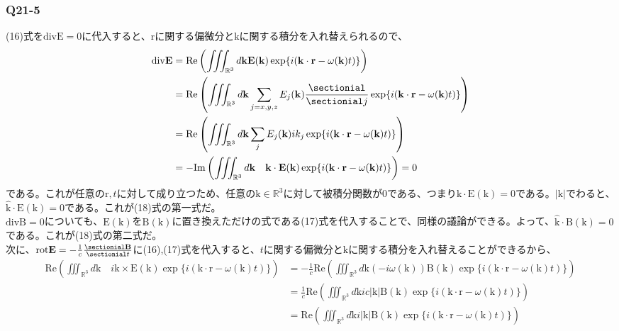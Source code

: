 \documentclass[platex,dvipdfmx,a4paper]{jsarticle}
\newcommand{\hb}[2]{\frac{\sectionial #1}{\sectionial #2}}
\newcommand{\vect}[1]{\boldsymbol{\mathrm{#1}}}
\begin{document}
  \subsubsection*{Q21-5}
  (16)式を$\mathrm{div}\vect{E}=0$に代入すると、$\vect{r}$に関する偏微分と$\vect{k}$に関する積分を入れ替えられるので、
  \begin{align*}
    \mathrm{div}\vect{E} &= \mathrm{Re}\left(\iiint_{\mathbb{R}^3} d\vect{k} \vect{E}(\vect{k}) \exp\{i(\vect{k}\cdot\vect{r}-\omega(\vect{k})t)\}\right)\\
    &= \mathrm{Re}\left(\iiint_{\mathbb{R}^3} d\vect{k}\sum_{j=x,y,z}E_j(\vect{k})\hb{}{j}\exp\{i(\vect{k}\cdot\vect{r}-\omega(\vect{k})t)\}\right)\\
    &= \mathrm{Re}\left(\iiint_{\mathbb{R}^3} d\vect{k} \sum_j E_j(\vect{k})ik_j\exp\{i(\vect{k}\cdot\vect{r}-\omega(\vect{k})t)\}\right)\\
    &= -\mathrm{Im}\left(\iiint_{\mathbb{R}^3} d\vect{k}\quad\vect{k}\cdot\vect{E}(\vect{k})\exp\{i(\vect{k}\cdot\vect{r}-\omega(\vect{k})t)\}\right)=0
  \end{align*}
  である。これが任意の$\vect{r},t$に対して成り立つため、任意の$\vect{k}\in{\mathbb{R}^3}$に対して被積分関数が$0$である、つまり$\vect{k}\cdot\vect{E}(\vect{k})=0$である。$|\vect{k}|$でわると、$\hat{\vect{k}}\cdot\vect{E}(\vect{k})=0$である。これが(18)式の第一式だ。\\
  $\mathrm{div}\vect{B}=0$についても、$\vect{E}(\vect{k})$を$\vect{B}(\vect{k})$に置き換えただけの式である(17)式を代入することで、同様の議論ができる。よって、$\hat{\vect{k}}\cdot\vect{B}(\vect{k})=0$である。これが(18)式の第二式だ。\\
  次に、$\mathrm{rot}\vect{E}=-\frac{1}{c}\hb{\vect{B}}{t}$に(16),(17)式を代入すると、$t$に関する偏微分と$\vect{k}$に関する積分を入れ替えることができるから、
  \begin{align*}
    \mathrm{Re}\left(\iiint_{\mathbb{R}^3} d\vect{k}\quad i\vect{k}\times\vect{E}(\vect{k})\exp\{i(\vect{k}\cdot\vect{r}-\omega(\vect{k})t)\}\right) &= -\frac{1}{c}\mathrm{Re}\left(\iiint_{\mathbb{R}^3} d\vect{k}(-i\omega(\vect{k}))\vect{B}(\vect{k})\exp\{i(\vect{k}\cdot\vect{r}-\omega(\vect{k})t)\}\right)\\
    &= \frac{1}{c}\mathrm{Re}\left(\iiint_{\mathbb{R}^3} d\vect{k}ic|\vect{k}|\vect{B}(\vect{k})\exp\{i(\vect{k}\cdot\vect{r}-\omega(\vect{k})t)\}\right)\\
    &= \mathrm{Re}\left(\iiint_{\mathbb{R}^3} d\vect{k}i|\vect{k}|\vect{B}(\vect{k})\exp\{i(\vect{k}\cdot\vect{r}-\omega(\vect{k})t)\}\right)
  \end{align*}
\end{document}
